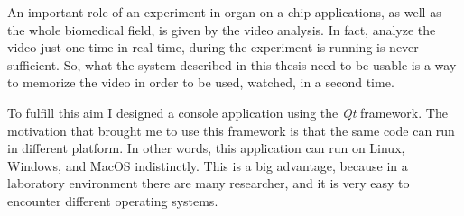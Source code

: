 An important role of an experiment in organ-on-a-chip applications, as well as the whole biomedical field, is given by the video analysis. In fact, analyze the video just one time in real-time, during the experiment is running is never sufficient. So, what the system described in this thesis need to be usable is a way to memorize the video in order to be used, watched, in a second time.

To fulfill this aim I designed a console application using the \textit{Qt} framework. The motivation that brought me to use this framework is that the same code can run in different platform. In other words, this application can run on Linux, Windows, and MacOS  indistinctly. This is a big advantage, because in a laboratory environment there are many researcher, and it is very easy to encounter different operating systems.